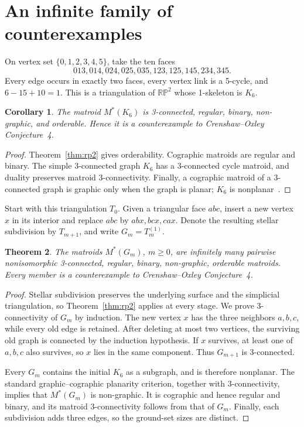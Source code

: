 \documentclass[11pt]{article}
\newtheorem{theorem}{Theorem}[section]
\newtheorem{corollary}[theorem]{Corollary}
\newcommand{\RP}{\mathbb{RP}}
\begin{document}
\section{An infinite family of counterexamples}

On vertex set $\{0,1,2,3,4,5\}$, take the ten faces
\[
013,014,024,025,035,123,125,145,234,345.
\]
Every edge occurs in exactly two faces, every vertex link is a 5-cycle, and
$6-15+10=1$. This is a triangulation of $\RP^2$ whose 1-skeleton is $K_6$.

\begin{corollary}\label{cor:k6}
The matroid $M^*(K_6)$ is 3-connected, regular, binary, non-graphic, and
orderable. Hence it is a counterexample to Crenshaw--Oxley Conjecture~4.
\end{corollary}

\begin{proof}
Theorem~\ref{thm:rp2} gives orderability. Cographic matroids are regular and
binary. The simple 3-connected graph $K_6$ has a 3-connected cycle matroid,
and duality preserves matroid 3-connectivity. Finally, a cographic matroid of
a 3-connected graph is graphic only when the graph is planar; $K_6$ is
nonplanar~\cite{oxley}.
\end{proof}

Start with this triangulation $T_0$. Given a triangular face $abc$, insert a
new vertex $x$ in its interior and replace $abc$ by $abx,bcx,cax$. Denote the
resulting stellar subdivision by $T_{m+1}$, and write $G_m=T_m^{(1)}$.

\begin{theorem}\label{thm:family}
The matroids $M^*(G_m)$, $m\ge0$, are infinitely many pairwise nonisomorphic
3-connected, regular, binary, non-graphic, orderable matroids. Every member is
a counterexample to Crenshaw--Oxley Conjecture~4.
\end{theorem}

\begin{proof}
Stellar subdivision preserves the underlying surface and the simplicial
triangulation, so Theorem~\ref{thm:rp2} applies at every stage. We prove
3-connectivity of $G_m$ by induction. The new vertex $x$ has the three
neighbors $a,b,c$, while every old edge is retained. After deleting at most
two vertices, the surviving old graph is connected by the induction
hypothesis. If $x$ survives, at least one of $a,b,c$ also survives, so $x$ lies
in the same component. Thus $G_{m+1}$ is 3-connected.

Every $G_m$ contains the initial $K_6$ as a subgraph, and is therefore
nonplanar. The standard graphic--cographic planarity criterion, together with
3-connectivity, implies that $M^*(G_m)$ is non-graphic. It is cographic and
hence regular and binary, and its matroid 3-connectivity follows from that of
$G_m$. Finally, each subdivision adds three edges, so the ground-set sizes are
distinct.
\end{proof}
\end{document}
